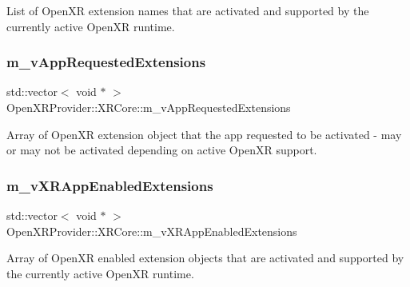 List of Open\+XR extension names that are activated and supported by the currently active Open\+XR runtime. 

\mbox{\label{class_open_x_r_provider_1_1_x_r_core_ad5f0fc798b07a6b0aac7c94084ac0c6d}} 
\subsubsection{\texorpdfstring{m\_vAppRequestedExtensions}{m\_vAppRequestedExtensions}}
{\footnotesize\ttfamily std\+::vector$<$ void $\ast$ $>$ Open\+X\+R\+Provider\+::\+X\+R\+Core\+::m\+\_\+v\+App\+Requested\+Extensions\hspace{0.3cm}{\ttfamily [private]}}



Array of Open\+XR extension object that the app requested to be activated -\/ may or may not be activated depending on active Open\+XR support. 

\mbox{\label{class_open_x_r_provider_1_1_x_r_core_aa07e03d01cdf71c4ce8a9dede09919a6}} 
\subsubsection{\texorpdfstring{m\_vXRAppEnabledExtensions}{m\_vXRAppEnabledExtensions}}
{\footnotesize\ttfamily std\+::vector$<$ void $\ast$ $>$ Open\+X\+R\+Provider\+::\+X\+R\+Core\+::m\+\_\+v\+X\+R\+App\+Enabled\+Extensions\hspace{0.3cm}{\ttfamily [private]}}



Array of Open\+XR enabled extension objects that are activated and supported by the currently active Open\+XR runtime. 

\mbox{\label{class_open_x_r_provider_1_1_x_r_core_a93ef906b53a23959df73da18d205c737}} 

